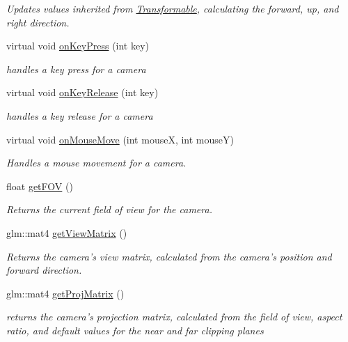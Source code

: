 \begin{DoxyCompactItemize}
\begin{DoxyCompactList}\small\item\em Updates values inherited from \hyperlink{class_transformable}{Transformable}, calculating the forward, up, and right direction. \end{DoxyCompactList}\item 
virtual void \hyperlink{class_camera_a10b868fe859868ce30c7b4523009e315}{on\-Key\-Press} (int key)
\begin{DoxyCompactList}\small\item\em handles a key press for a camera \end{DoxyCompactList}\item 
virtual void \hyperlink{class_camera_a5106fd522318a7d5bf588648b7afa996}{on\-Key\-Release} (int key)
\begin{DoxyCompactList}\small\item\em handles a key release for a camera \end{DoxyCompactList}\item 
virtual void \hyperlink{class_camera_ab2a7799db840c22322ab06ef968e4f3e}{on\-Mouse\-Move} (int mouse\-X, int mouse\-Y)
\begin{DoxyCompactList}\small\item\em Handles a mouse movement for a camera. \end{DoxyCompactList}\item 
float \hyperlink{class_camera_a5ec1871e6f296d8528e64157c6371c09}{get\-F\-O\-V} ()
\begin{DoxyCompactList}\small\item\em Returns the current field of view for the camera. \end{DoxyCompactList}\item 
glm\-::mat4 \hyperlink{class_camera_a5569ca5967e01d3344fbf6aba36d9820}{get\-View\-Matrix} ()
\begin{DoxyCompactList}\small\item\em Returns the camera's view matrix, calculated from the camera's position and forward direction. \end{DoxyCompactList}\item 
glm\-::mat4 \hyperlink{class_camera_a4e4f082071bdf7da528ecf19e09f938d}{get\-Proj\-Matrix} ()
\begin{DoxyCompactList}\small\item\em returns the camera's projection matrix, calculated from the field of view, aspect ratio, and default values for the near and far clipping planes \end{DoxyCompactList}\end{DoxyCompactItemize}

